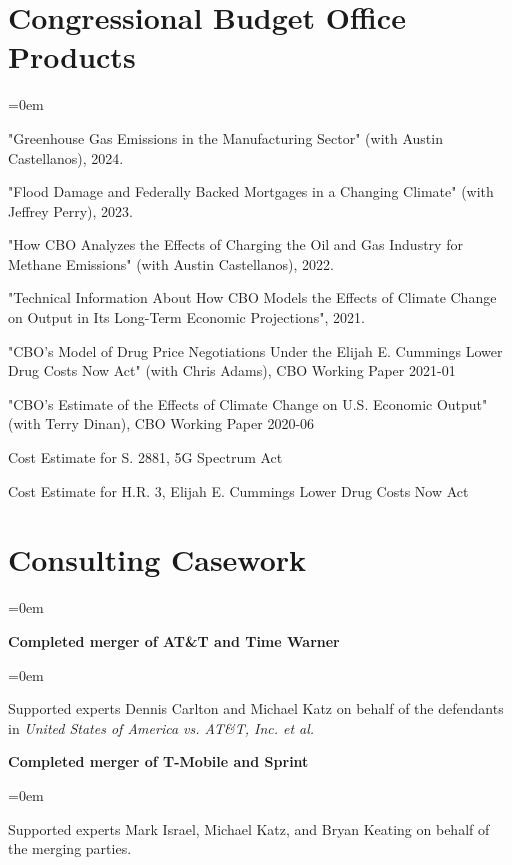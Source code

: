 \documentclass[letterpaper]{article}
\renewenvironment{itemize}{
  \vspace{-0.5em}
  \begin{list}{}{
	\itemsep=0em
    \setlength{\leftmargin}{1.5em}
  }
}{
  \end{list}
}
\begin{document}
\section*{Congressional Budget Office Products}
\begin{itemize}
\item "Greenhouse Gas Emissions in the Manufacturing Sector" (with Austin Castellanos), 2024.
\item "Flood Damage and Federally Backed Mortgages in a Changing Climate" (with Jeffrey Perry), 2023.
\item "How CBO Analyzes the Effects of Charging the Oil and Gas Industry for Methane Emissions" (with Austin Castellanos), 2022.
\item "Technical Information About How CBO Models the Effects of Climate Change on Output in Its Long-Term Economic Projections", 2021.
\item "CBO’s Model of Drug Price Negotiations Under the Elijah E. Cummings Lower Drug Costs Now Act" (with Chris Adams), CBO Working Paper 2021-01
\item "CBO’s Estimate of the Effects of Climate Change on U.S. Economic Output" (with Terry Dinan), CBO Working Paper 2020-06
\item Cost Estimate for S. 2881, 5G Spectrum Act
\item Cost Estimate for H.R. 3, Elijah E. Cummings Lower Drug Costs Now Act
\end{itemize}

\section*{Consulting Casework}
\begin{itemize}
\item \textbf{Completed merger of AT\&T and Time Warner}
\begin{itemize}
\item Supported experts Dennis Carlton and Michael Katz on behalf of the defendants in \textit{United States of America vs. AT\&T, Inc. et al.}
\end{itemize}
\item \textbf{Completed merger of T-Mobile and Sprint}
\begin{itemize}
\item Supported experts Mark Israel, Michael Katz, and Bryan Keating on behalf of the merging parties.
\end{itemize}
\end{itemize}
\end{document}
